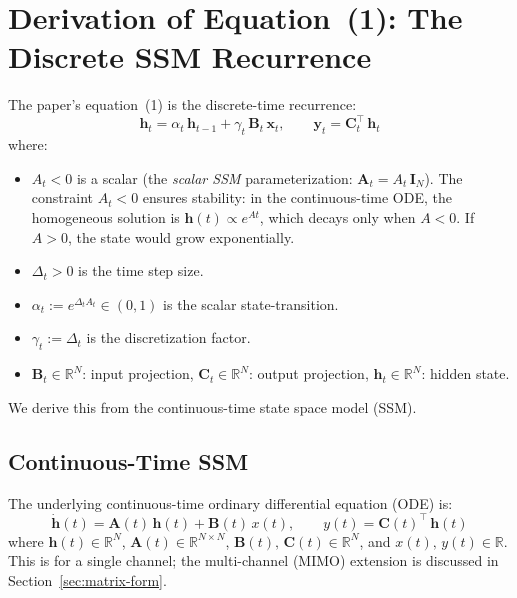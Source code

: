 \documentclass[11pt,a4paper]{article}
\begin{document}
\section{Derivation of Equation~(1): The Discrete SSM Recurrence}

The paper's equation~(1) is the discrete-time recurrence:
\begin{equation}\label{eq:paper-eq1}\tag{paper 1}
  \mathbf{h}_t = \alpha_t\,\mathbf{h}_{t-1} + \gamma_t\,\mathbf{B}_t\,\mathbf{x}_t,
  \qquad
  \mathbf{y}_t = \mathbf{C}_t^\top\,\mathbf{h}_t
\end{equation}
where:
\begin{itemize}
  \item $A_t < 0$ is a scalar (the \emph{scalar SSM} parameterization: $\mathbf{A}_t = A_t\,\mathbf{I}_N$).
    The constraint $A_t < 0$ ensures stability: in the continuous-time ODE, the homogeneous solution is $\mathbf{h}(t) \propto e^{At}$, which decays only when $A < 0$.
    If $A > 0$, the state would grow exponentially.
  \item $\Delta_t > 0$ is the time step size.
  \item $\alpha_t := e^{\Delta_t A_t} \in (0,1)$ is the scalar state-transition.
  \item $\gamma_t := \Delta_t$ is the discretization factor.
  \item $\mathbf{B}_t \in \mathbb{R}^{N}$: input projection, $\mathbf{C}_t \in \mathbb{R}^{N}$: output projection, $\mathbf{h}_t \in \mathbb{R}^{N}$: hidden state.
\end{itemize}

We derive this from the continuous-time state space model (SSM).

\subsection{Continuous-Time SSM}

The underlying continuous-time ordinary differential equation (ODE) is:
\begin{equation}\label{eq:ode}
  \dot{\mathbf{h}}(t) = \mathbf{A}(t)\,\mathbf{h}(t) + \mathbf{B}(t)\,x(t),
  \qquad
  y(t) = \mathbf{C}(t)^\top\,\mathbf{h}(t)
\end{equation}
where $\mathbf{h}(t) \in \mathbb{R}^{N}$, $\mathbf{A}(t) \in \mathbb{R}^{N \times N}$, $\mathbf{B}(t),\,\mathbf{C}(t) \in \mathbb{R}^{N}$, and $x(t),\,y(t) \in \mathbb{R}$.
This is for a single channel; the multi-channel (MIMO) extension is discussed in Section~\ref{sec:matrix-form}.
\end{document}
